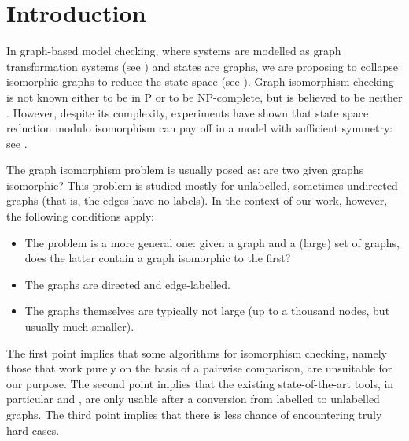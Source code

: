 \section{Introduction}

In graph-based model checking, where systems are modelled as graph
transformation systems (see \cite{rensink2008:explicit}) and states are graphs,
we are proposing to collapse isomorphic graphs to reduce the state space (see
\cite{rensink2009:isomorphism}). Graph isomorphism checking is not known either
to be in P or to be NP-complete, but is believed to be neither
\cite{messmer1999:decision,weisstein2009:isomorphic}. However, despite its
complexity, experiments have shown that state space reduction modulo isomorphism
can pay off in a model with sufficient symmetry: see \cite{crouzen2008:gossiping}.

The graph isomorphism problem is usually posed as: are two given graphs
isomorphic? This problem is studied mostly for unlabelled, sometimes undirected
graphs (that is, the edges have no labels). In the context of our work,
however, the following conditions apply:
%
\begin{itemize}\itemsep0pt
\item The problem is a more general one: given a graph and a (large) set of
  graphs, does the latter contain a graph isomorphic to the first?

\item The graphs are directed and edge-labelled.

\item The graphs themselves are typically not large (up to a thousand nodes, but
  usually much smaller).
\end{itemize}
%
The first point implies that some algorithms for isomorphism checking, namely
those that work purely on the basis of a pairwise comparison, are unsuitable
for our purpose. The second point implies that the existing state-of-the-art
tools, in particular \NAUTY \cite{mckay2008:nauty24,mckay1981:practical} and
\BLISS \cite{junttila2008:bliss,junttila2007:engineering}, are only usable after
a conversion from labelled to unlabelled graphs. The third point implies that
there is less chance of encountering truly hard cases.

